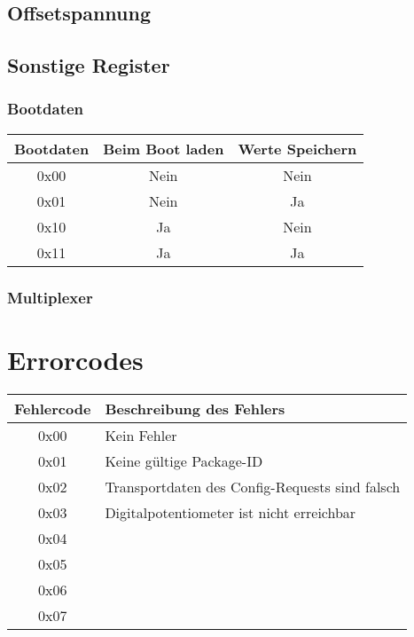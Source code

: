 \lstset{style=C}

\subsection{Offsetspannung}
\subsection{Sonstige Register}
\subsubsection{Bootdaten}

\begin{flushleft}
\begin{tabular}{c||c|c}
Bootdaten & Beim Boot laden & Werte Speichern\\
\hline
\hline
0x00 & Nein & Nein \\
\hline
0x01 & Nein & Ja\\
\hline
0x10 & Ja & Nein \\
\hline
0x11 & Ja & Ja \\
\end{tabular}
\end{flushleft}


\subsubsection{Multiplexer}
\section{Errorcodes}

\begin{flushleft}
\begin{tabular}{c||l}
Fehlercode & Beschreibung des Fehlers \\
\hline
\hline
0x00 & Kein Fehler \\
\hline
0x01 & Keine gültige Package-ID \\
\hline
0x02 & Transportdaten des Config-Requests sind falsch \\
\hline
0x03 & Digitalpotentiometer ist nicht erreichbar \\
\hline
0x04 &  \\
\hline
0x05 &  \\
\hline
0x06 &  \\
\hline
0x07 &  \\

\end{tabular}
\end{flushleft}
